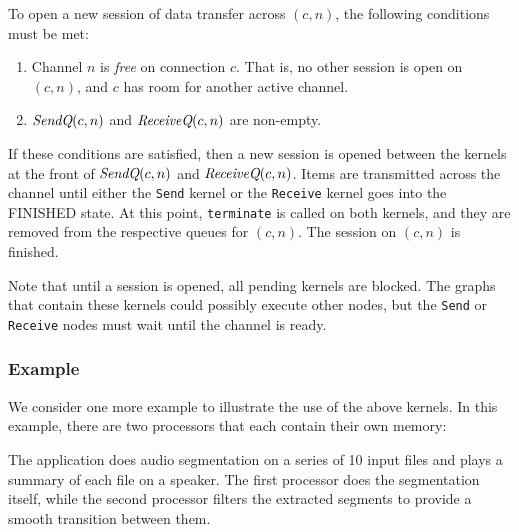 To open a new session of data transfer across $(c, n)$, the following
conditions must be met:
\begin{enumerate}

\item Channel $n$ is {\it free} on connection $c$.  That is, no other
session is open on $(c, n)$, and $c$ has room for another active
channel.

\item $\mbox{\it SendQ}(c, n)$ and $\mbox{\it ReceiveQ}(c, n)$ are non-empty.

\end{enumerate}
If these conditions are satisfied, then a new session is opened
between the kernels at the front of $\mbox{\it SendQ}(c, n)$ and
$\mbox{\it ReceiveQ}(c, n)$.  Items are transmitted across the channel until
either the {\tt Send} kernel or the {\tt Receive} kernel goes into the
FINISHED state.  At this point, {\tt terminate} is called on both
kernels, and they are removed from the respective queues for $(c, n)$.
The session on $(c, n)$ is finished.

Note that until a session is opened, all pending kernels are blocked.
The graphs that contain these kernels could possibly execute other
nodes, but the {\tt Send} or {\tt Receive} nodes must wait until the
channel is ready.

\subsubsection*{Example}

We consider one more example to illustrate the use of the above
kernels.  In this example, there are two processors that each contain
their own memory:

\begin{figure}[h]
\begin{center}
\end{center}
\vspace{-12pt}
\end{figure}

The application does audio segmentation on a series of 10 input files
and plays a summary of each file on a speaker.  The first processor
does the segmentation itself, while the second processor filters the
extracted segments to provide a smooth transition between them.

